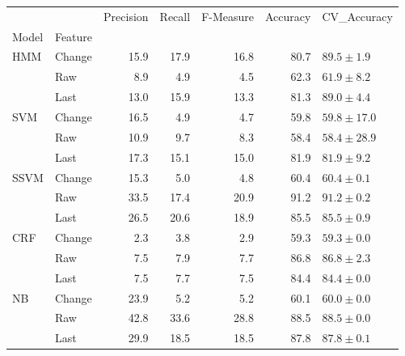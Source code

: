 \documentclass{article}
\begin{document}
\begin{tabular}{llrrrrl}
\toprule
    &        &  Precision &  Recall &  F-Measure &  Accuracy &    CV\_Accuracy \\
Model & Feature &            &         &            &           &                \\
\midrule
HMM & Change &       15.9 &    17.9 &       16.8 &      80.7 &   $89.5\pm1.9$ \\
    & Raw &        8.9 &     4.9 &        4.5 &      62.3 &   $61.9\pm8.2$ \\
    & Last &       13.0 &    15.9 &       13.3 &      81.3 &   $89.0\pm4.4$ \\
SVM & Change &       16.5 &     4.9 &        4.7 &      59.8 &  $59.8\pm17.0$ \\
    & Raw &       10.9 &     9.7 &        8.3 &      58.4 &  $58.4\pm28.9$ \\
    & Last &       17.3 &    15.1 &       15.0 &      81.9 &   $81.9\pm9.2$ \\
SSVM & Change &       15.3 &     5.0 &        4.8 &      60.4 &   $60.4\pm0.1$ \\
    & Raw &       33.5 &    17.4 &       20.9 &      91.2 &   $91.2\pm0.2$ \\
    & Last &       26.5 &    20.6 &       18.9 &      85.5 &   $85.5\pm0.9$ \\
CRF & Change &        2.3 &     3.8 &        2.9 &      59.3 &   $59.3\pm0.0$ \\
    & Raw &        7.5 &     7.9 &        7.7 &      86.8 &   $86.8\pm2.3$ \\
    & Last &        7.5 &     7.7 &        7.5 &      84.4 &   $84.4\pm0.0$ \\
NB & Change &       23.9 &     5.2 &        5.2 &      60.1 &   $60.0\pm0.0$ \\
    & Raw &       42.8 &    33.6 &       28.8 &      88.5 &   $88.5\pm0.0$ \\
    & Last &       29.9 &    18.5 &       18.5 &      87.8 &   $87.8\pm0.1$ \\
\bottomrule
\end{tabular}
\vspace{1cm}\\
\end{document}
